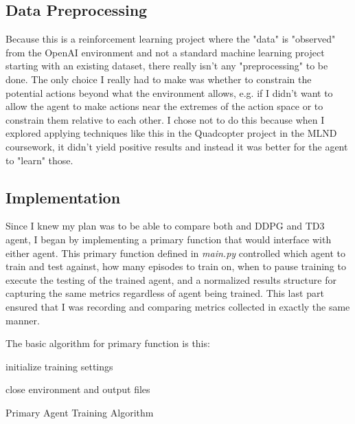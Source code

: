 \documentclass{article}
\begin{document}
\subsection{Data Preprocessing}
Because this is a reinforcement learning project where the "data" is "observed" from the OpenAI environment and not a standard machine learning project starting with an existing dataset, there really isn't any "preprocessing" to be done. The only choice I really had to make was whether to constrain the potential actions beyond what the environment allows, e.g. if I didn't want to allow the agent to make actions near the extremes of the action space or to constrain them relative to each other. I chose not to do this because when I explored applying techniques like this in the Quadcopter project in the MLND coursework, it didn't yield positive results and instead it was better for the agent to "learn" those.


\subsection{Implementation}
Since I knew my plan was to be able to compare both and DDPG and TD3 agent, I began by implementing a primary function that would interface with either agent. This primary function defined in \textit{main.py} controlled which agent to train and test against, how many episodes to train on, when to pause training to execute the testing of the trained agent, and a normalized results structure for capturing the same metrics regardless of agent being trained. This last part ensured that I was recording and comparing metrics collected in exactly the same manner. 

The basic algorithm for primary function is this:

\begin{algorithm}[H]
\SetAlgoLined

initialize training settings\;


close environment and output files\;

\caption{Primary Agent Training Algorithm}
\end{algorithm}
\end{document}
